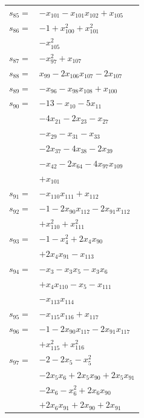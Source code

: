 \begin{longtable}{@{}r@{\;}l@{}}
\(s_{85}=\) & \(\displaystyle -x_{101} -x_{101}x_{102} +x_{105}\) \\[3pt]
\(s_{86}=\) & \(\displaystyle -1 +x_{100}^{2} +x_{101}^{2}\) \\
 & \(\displaystyle -x_{105}^{2}\) \\[3pt]
\(s_{87}=\) & \(\displaystyle -x_{97}^{2} +x_{107}\) \\[3pt]
\(s_{88}=\) & \(\displaystyle x_{99} -2x_{106}x_{107} -2x_{107}\) \\[3pt]
\(s_{89}=\) & \(\displaystyle -x_{96} -x_{98}x_{108} +x_{100}\) \\[3pt]
\(s_{90}=\) & \(\displaystyle -13 -x_{10} -5x_{11}\) \\
 & \(\displaystyle -4x_{21} -2x_{23} -x_{27}\) \\
 & \(\displaystyle -x_{29} -x_{31} -x_{33}\) \\
 & \(\displaystyle -2x_{37} -4x_{38} -2x_{39}\) \\
 & \(\displaystyle -x_{42} -2x_{64} -4x_{97}x_{109}\) \\
 & \(\displaystyle +x_{101}\) \\[3pt]
\(s_{91}=\) & \(\displaystyle -x_{110}x_{111} +x_{112}\) \\[3pt]
\(s_{92}=\) & \(\displaystyle -1 -2x_{90}x_{112} -2x_{91}x_{112}\) \\
 & \(\displaystyle +x_{110}^{2} +x_{111}^{2}\) \\[3pt]
\(s_{93}=\) & \(\displaystyle -1 -x_{4}^{2} +2x_{4}x_{90}\) \\
 & \(\displaystyle +2x_{4}x_{91} -x_{113}\) \\[3pt]
\(s_{94}=\) & \(\displaystyle -x_{3} -x_{3}x_{5} -x_{3}x_{6}\) \\
 & \(\displaystyle +x_{4}x_{110} -x_{5} -x_{111}\) \\
 & \(\displaystyle -x_{113}x_{114}\) \\[3pt]
\(s_{95}=\) & \(\displaystyle -x_{115}x_{116} +x_{117}\) \\[3pt]
\(s_{96}=\) & \(\displaystyle -1 -2x_{90}x_{117} -2x_{91}x_{117}\) \\
 & \(\displaystyle +x_{115}^{2} +x_{116}^{2}\) \\[3pt]
\(s_{97}=\) & \(\displaystyle -2 -2x_{5} -x_{5}^{2}\) \\
 & \(\displaystyle -2x_{5}x_{6} +2x_{5}x_{90} +2x_{5}x_{91}\) \\
 & \(\displaystyle -2x_{6} -x_{6}^{2} +2x_{6}x_{90}\) \\
 & \(\displaystyle +2x_{6}x_{91} +2x_{90} +2x_{91}\) \\

\end{longtable}
